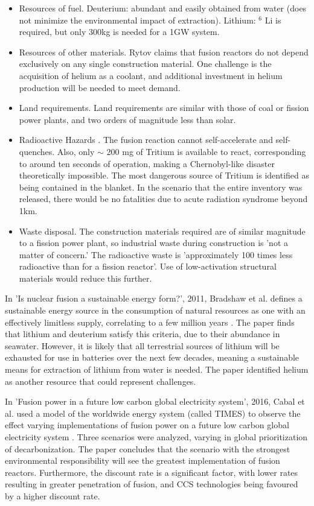 \begin{itemize}
    \item Resources of fuel. Deuterium: abundant and easily obtained from water (does not minimize the environmental impact of extraction). Lithium: $^6$ Li is required, but only 300kg is needed for a 1GW system.
    \item Resources of other materials. Rytov claims that fusion reactors do not depend exclusively on any single construction material. One challenge is the acquisition of helium as a coolant, and additional investment in helium production will be needed to meet demand.
    \item Land requirements. Land requirements are similar with those of coal or fission power plants, and two orders of magnitude less than solar.
    \item Radioactive Hazards . The fusion reaction cannot self-accelerate and self-quenches. Also, only $\sim$ 200 mg of Tritium is available to react, corresponding to around ten seconds of operation, making a Chernobyl-like disaster theoretically impossible. The most dangerous source of Tritium is identified as being contained in the blanket. In the scenario that the entire inventory was released, there would be no fatalities due to acute radiation syndrome beyond 1km.
    \item Waste disposal. The construction materials required are of similar magnitude to a fission power plant, so industrial waste during construction is 'not a matter of concern.' The radioactive waste is 'approximately 100 times less radioactive than for a fission reactor'. Use of low-activation structural materials would reduce this further.
\end{itemize}

In 'Is nuclear fusion a sustainable energy form?', 2011, Bradshaw et al. defines a sustainable energy source in the consumption of natural resources as one with an effectively limitless supply, correlating to a few million years \cite{bradshaw2011nuclear}. The paper finds that lithium and deuterium satisfy this criteria, due to their abundance in seawater. However, it is likely that all terrestrial sources of lithium will be exhausted for use in batteries over the next few decades, meaning a sustainable means for extraction of lithium from water is needed. The paper identified helium as another resource that could represent challenges.

In 'Fusion power in a future low carbon global electricity system', 2016, Cabal et al. used a model of the worldwide energy system (called TIMES) to observe the effect varying implementations of fusion power on a future low carbon global electricity system \cite{cabal2017fusion}. Three scenarios were analyzed, varying in global prioritization of decarbonization. The paper concludes that the scenario with the strongest environmental responsibility will see the greatest implementation of fusion reactors. Furthermore, the discount rate is a significant factor, with lower rates resulting in greater penetration of fusion, and CCS technologies being favoured by a higher discount rate.

